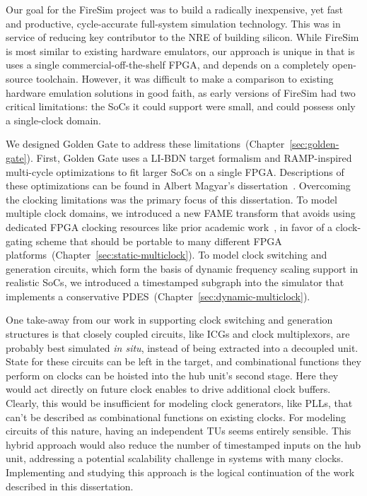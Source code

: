Our goal for the FireSim project was to build a radically
inexpensive, yet fast and productive, cycle-accurate full-system simulation
technology. This was in service of reducing key contributor to the NRE of building silicon.  While
FireSim is most similar to existing hardware emulators, our approach is
unique in that is uses a single commercial-off-the-shelf FPGA, and depends on a
completely open-source toolchain. However, it was difficult to make a comparison to existing hardware emulation solutions
in good faith, as early versions of FireSim had two critical limitations: the SoCs it could support 
were small, and could possess only a single-clock domain.

We designed Golden Gate to address these limitations~(Chapter~\ref{sec:golden-gate}). First, Golden Gate uses a LI-BDN
target formalism and RAMP-inspired multi-cycle optimizations to fit larger SoCs
on a single FPGA. Descriptions of these optimizations can be found in Albert
Magyar's dissertation~\cite{MagyarDissertation}. Overcoming the clocking limitations was the primary focus of this dissertation.
To model multiple clock domains, we introduced a new FAME transform that avoids
using dedicated FPGA clocking resources like prior academic work~\cite{DVFSPrototype}, in favor of a
clock-gating scheme that should be portable to many different FPGA
platforms~(Chapter~\ref{sec:static-multiclock}). To model clock switching and
generation circuits, which form the basis of dynamic frequency scaling support
in realistic SoCs, we introduced a timestamped subgraph into the simulator that
implements a conservative PDES~(Chapter~\ref{sec:dynamic-multiclock}).

One take-away from our work in supporting clock switching and generation
structures is that closely coupled circuits, like ICGs and
clock multiplexors, are probably best simulated \emph{in situ}, instead of
being extracted into a decoupled unit. State for these circuits can be left in
the target, and combinational functions they perform on clocks can be hoisted
into the hub unit's second stage. Here they would act directly on future clock
enables to drive additional clock buffers. Clearly, this would be
insufficient for modeling clock generators, like PLLs, that can't be described
as combinational functions on existing clocks. For modeling circuits of this
nature, having an independent TUs seems entirely sensible.  This hybrid
approach would also reduce the number of timestamped inputs on the hub unit,
addressing a potential scalability challenge in systems with many clocks.
Implementing and studying this approach is the logical continuation of the
work described in this dissertation.

